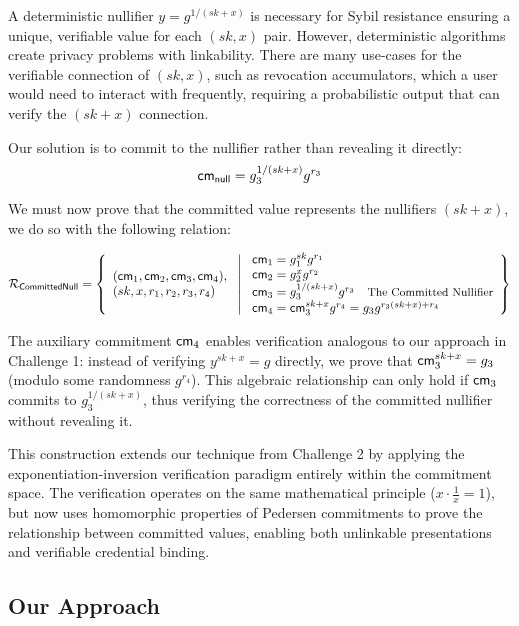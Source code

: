 A deterministic nullifier $y = g^{1/(sk+x)}$ is necessary for Sybil resistance ensuring a unique, verifiable value for each $(sk,x)$ pair. However, deterministic algorithms create privacy problems with linkability. There are many use-cases for the verifiable connection of $(sk, x)$, such as revocation accumulators, which a user would need to interact with frequently, requiring a probabilistic output that can verify the $(sk+x)$ connection. 

Our solution is to commit to the nullifier rather than revealing it directly:
\[
\mathsf{cm}_{\mathsf{null}} = g_3^{1/(sk+x)} g^{r_3}
\]

We must now prove that the committed value represents the nullifiers $(sk+x)$, we do so with the following relation:


\[
\mathcal{R}_{\mathsf{CommittedNull}} = \left\{ 
\begin{array}{l} 
(\mathsf{cm}_1, \mathsf{cm}_2, \mathsf{cm}_3, \mathsf{cm}_4), \\
(sk, x, r_1, r_2, r_3, r_4) 
\end{array}
\ \middle| \
\begin{array}{l}
\mathsf{cm}_1 = g_1^{sk} g^{r_1} \\
\mathsf{cm}_2 = g_2^{x} g^{r_2} \\
\mathsf{cm}_3 = g_3^{1/(sk + x)} g^{r_3}  \quad \text{\small{The Committed Nullifier}}\\
\mathsf{cm}_4 = \mathsf{cm}_3^{sk + x} g^{r_4} = g_3 g^{r_3 (sk + x) + r_4}
\end{array} \right\}
\]

The auxiliary commitment $\mathsf{cm}_4$ enables verification analogous to our approach in Challenge 1: instead of verifying $y^{sk+x} = g$ directly, we prove that $\mathsf{cm}_3^{sk+x} = g_3$ (modulo some randomness $g^{r_4}$). This algebraic relationship can only hold if $\mathsf{cm}_3$ commits to $g_3^{1/(sk+x)}$, thus verifying the correctness of the committed nullifier without revealing it.

This construction extends our technique from Challenge 2 by applying the exponentiation-inversion verification paradigm entirely within the commitment space. The verification operates on the same mathematical principle ($x \cdot \frac{1}{x} = 1$), but now uses homomorphic properties of Pedersen commitments to prove the relationship between committed values, enabling both unlinkable presentations and verifiable credential binding.




\subsection{Our Approach}

